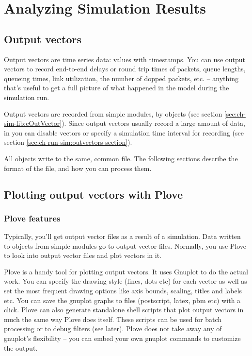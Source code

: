 \chapter{Analyzing Simulation Results}
\label{cha:analyzing-simulation-results}


\section{Output vectors}

Output vectors are time series data: values with timestamps.
You can use output vectors to record end-to-end delays or
round trip times of packets, queue lengths, queueing times,
link utilization, the number of dopped packets, etc. --
anything that's useful to get a full picture of what happened
in the model during the simulation run.

Output vectors are recorded from simple modules, by  objects
(see section \ref{sec:ch-sim-lib:cOutVector}). Since output vectors usually
record a large amount of data, in  you can disable vectors
or specify a simulation time interval for recording
(see section \ref{sec:ch-run-sim:outvectors-section}).

All  objects write to the same, common file.
The following sections describe the format of the file, and
how you can process them.


\section{Plotting output vectors with Plove}

\subsection{Plove features}

Typically, you'll get output vector files as a result of a simulation.
Data written to  objects from
simple modules go to output vector
files. Normally, you use Plove to look
into output vector files and plot vectors in it.

Plove is a handy tool for plotting {\opp} output vectors.
It uses Gnuplot to do the actual work. You can specify
the drawing style (lines, dots etc) for each vector as well as set the
most frequent drawing options like axis bounds, scaling, titles and
labels etc. You can save the gnuplot graphs to files (postscript,
latex, pbm etc) with a click. Plove can also generate standalone shell
scripts that plot output vectors in much the same way Plove does
itself. These scripts can be used for batch processing or to debug
filters (see later). Plove does not take away any of gnuplot's
flexibility -- you can embed your own gnuplot commands to customize
the output.


